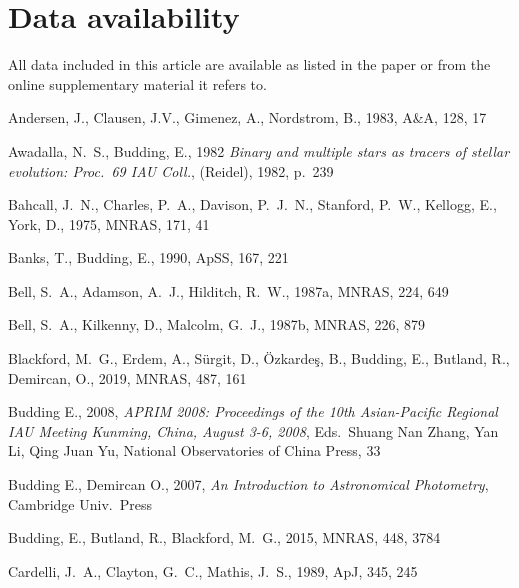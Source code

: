 \documentclass[useAMS,usenatbib]{mnras}                                                                           \usepackage[pdftex]{graphicx}
\begin{document}
\section{Data availability}
All data included in this article are available as listed in the paper or
from the online supplementary material it refers to. 

\begin{thebibliography}{}
 
Andersen, J., Clausen, J.V., Gimenez, A., Nordstrom, B.,  1983, A\&A, 128, 17

Awadalla, N.\ S., Budding, E., 1982 
{\em Binary and multiple stars as tracers of stellar evolution: Proc.\ 69 IAU Coll.}, (Reidel), 1982, p.\ 239

Bahcall, J.\ N., Charles, P.\ A., Davison, P.\ J.\ N., Stanford, P.\ W., Kellogg, E., York, D., 1975, MNRAS, 171, 41

Banks, T., Budding, E., 1990, ApSS, 167, 221

Bell, S.\ A., Adamson, A.\ J.,  Hilditch, R.\ W., 1987a, MNRAS, 224, 649
 
Bell, S.\ A., Kilkenny, D.,   Malcolm, G.\ J., 1987b, MNRAS, 226, 879

Blackford, M.\ G., Erdem, A., S\"{u}rgit, D., \"{O}zkarde\c{s}, B., Budding, E., Butland, R., Demircan, O., 
2019, MNRAS, 487, 161

Budding E., 
2008, {\em APRIM 2008: Proceedings of the 10th Asian-Pacific Regional IAU Meeting
Kunming, China, August 3-6, 2008},
Eds.\ Shuang Nan Zhang, Yan Li,  Qing Juan Yu,
National Observatories of China Press, 33

Budding E., Demircan O., 2007, {\em An Introduction to Astronomical
Photometry}, Cambridge Univ.\ Press 

Budding, E., Butland, R., Blackford, M.\ G., 2015, MNRAS, 448, 3784
 
Cardelli, J.\ A., Clayton, G.\ C., Mathis, J.\ S., 1989,
ApJ, 345, 245


\end{thebibliography}
\end{document}
